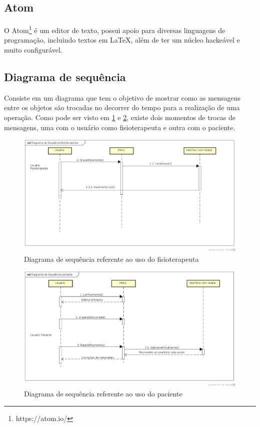     \subsection{Atom}\label{sub:atom}
    		O Atom\footnote{https://atom.io/} é um editor de texto, possui apoio para diversas linguagens de programação, incluindo textos em LaTeX, além de
    ter um núcleo hackeável e muito configurável.



    \subsection{Diagrama de sequência}\label{sub:diagramaSequencia}
      Consiste em um diagrama que tem o objetivo de mostrar como as mensagens entre os objetos são trocadas no decorrer do tempo para a realização de uma operação\cite{diagramaSequencia}.
    Como pode ser visto em \ref{diagramaFisio} e \ref{diagramaPaciente}, existe dois momentos de trocas de mensagens, uma com o usuário como fisioterapeuta e outra
    com o paciente.

    \begin{figure}[!h]
    \centering
    \includegraphics [keepaspectratio=true,scale=0.45]{figuras/diagramaFisio.eps}

    \caption{Diagrama de sequência referente ao uso do fisioterapeuta}
    \label{diagramaFisio}
    \end{figure}


    \begin{figure}[!h]
    \centering
    \includegraphics [keepaspectratio=true,scale=0.45]{figuras/diagramaPaciente.eps}

    \caption{Diagrama de sequência referente ao uso do paciente}
    \label{diagramaPaciente}
    \end{figure}

